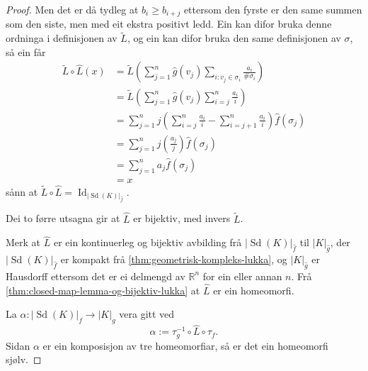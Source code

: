 \documentclass[a4paper, 12pt, norsk]{article}
\theoremstyle{plain}
\theoremstyle{definition}
\newcommand{\Rb}{\mathbb{R}}
\newcommand{\gr}[1]{ \lvert #1 \rvert } %
\newcommand{\tuple}[1]{ \left( #1 \right) } %
\DeclareMathOperator{\Sd}{Sd} %
\DeclareMathOperator{\Id}{Id} %
\begin{document}
\begin{proof}
	Men det er då tydleg at \( b_i \geq b_{i+j} \) ettersom den fyrste er den same summen som den siste, men med eit ekstra positivt ledd. Ein kan difor bruka denne ordninga i definisjonen av \( \tilde{L} \), og ein kan difor bruka den same definisjonen av \( \sigma \), så ein får
	\begin{align*}
		\tilde{L}\circ\hat{L}(x) &= \tilde{L}\tuple{\sum_{j=1}^n \hat{g}(v_j) \sum_{i:v_j\in\sigma_i}\frac{a_i}{\#\sigma_i}} \\
		&= \tilde{L}\tuple{\sum_{j=1}^n \hat{g}(v_j) \sum_{i=j}^n \frac{a_i}{i}} \\
		&= \sum_{j=1}^n j\tuple{\sum_{i=j}^n \frac{a_i}{i} - \sum_{i=j+1}^n \frac{a_i}{i}}\hat{f}(\sigma_j) \\
		&= \sum_{j=1}^n j\tuple{\frac{a_j}{j}}\hat{f}(\sigma_j) \\
		&= \sum_{j=1}^n a_j \hat{f}(\sigma_j) \\
		&= x
	\end{align*}
	sånn at \( \tilde{L}\circ\hat{L} = \Id_{\gr{\Sd(K)}_{\hat{f}}} \). 
	
	Dei to førre utsagna gir at \( \hat{L} \) er bijektiv, med invers \( \tilde{L} \).

	Merk at \( \hat{L} \) er ein kontinuerleg og bijektiv avbilding frå \( \gr{\Sd(K)}_{\hat{f}} \) til \( \gr{K}_{\hat{g}} \), der \( \gr{\Sd(K)}_{\hat{f}} \) er kompakt frå \autoref{thm:geometrisk-kompleks-lukka}, og  \( \gr{K}_{\hat{g}} \) er Hausdorff ettersom det er ei delmengd av \( \Rb^n \) for ein eller annan \( n \). Frå \autoref{thm:closed-map-lemma-og-bijektiv-lukka} at \( \hat{L} \) er ein homeomorfi.

	La \( \alpha: \gr{\Sd(K)}_f \to \gr{K}_g \) vera gitt ved
	\[
		\alpha := \tau_g^{-1} \circ \hat{L} \circ \tau_f.
	\]
	Sidan \( \alpha \) er ein komposisjon av tre homeomorfiar, så er det ein homeomorfi sjølv.
\end{proof}
\end{document}
